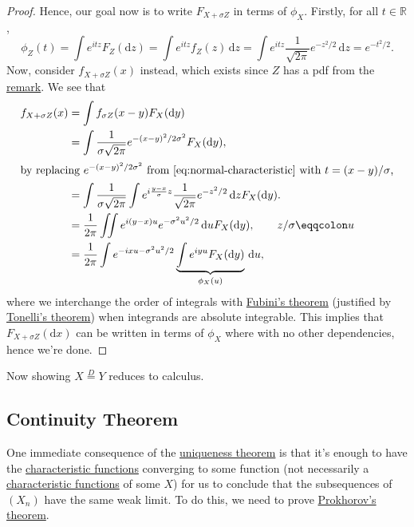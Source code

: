 \begin{proof}
	Hence, our goal now is to write \(F_{X + \sigma Z}\) in terms of \(\phi _X\). Firstly, for all \(t\in \mathbb{R} \),
	\begin{equation}\label{eq:normal-characteristic}
		\phi _Z(t)
		= \int e^{i t z} F_Z(\mathrm{d} z)
		= \int e^{i t z} f_Z(z) \,\mathrm{d} z
		= \int e^{i t z} \frac{1}{\sqrt{2\pi } } e^{-z^2 / 2} \,\mathrm{d} z
		= e^{-t^2 / 2}.
	\end{equation}
	Now, consider \(f_{X + \sigma Z}(x)\) instead, which exists since \(Z\) has a pdf from the \hyperref[rmk:pdf-of-X+Y]{remark}. We see that
	\begin{align*}
		f_{X + \sigma Z}(x)
		 & = \int f_{\sigma Z}(x-y) F_{X}(\mathrm{d} y)                                                                                                       \\
		 & = \int \frac{1}{\sigma \sqrt{2 \pi } } e^{- (x-y)^2 / 2\sigma ^2} F_X(\mathrm{d} y) ,                                                              \\
		\shortintertext{by replacing \(e^{-(x-y)^2 / 2\sigma ^2}\) from \autoref{eq:normal-characteristic} with \(t = (x - y) / \sigma \),}
		 & = \int \frac{1}{\sigma \sqrt{2\pi } } \int e^{i \frac{y - x}{\sigma } z} \frac{1}{\sqrt{2\pi } }  e^{- z^2 / 2} \,\mathrm{d} z F_X(\mathrm{d} y) . \\
		 & = \frac{1}{2\pi } \iint e^{i (y - x) u} e^{- \sigma ^2 u^2 / 2} \,\mathrm{d} u F_X(\mathrm{d} y) , \tag*{\(z / \sigma \eqqcolon u\)}               \\
		 & = \frac{1}{2\pi } \int e^{-i x u - \sigma ^2 u^2 / 2} \underbrace{\int e^{i y u} F_X(\mathrm{d} y)}_{\phi _X(u)} \,\mathrm{d} u ,
	\end{align*}
	where we interchange the order of integrals with \href{https://en.wikipedia.org/wiki/Fubini's_theorem}{Fubini's theorem} (justified by \href{https://en.wikipedia.org/wiki/Fubini%27s_theorem#Fubini%E2%80%93Tonelli_theorem}{Tonelli's theorem}) when integrands are absolute integrable. This implies that \(F_{X + \sigma Z} (\mathrm{d} x)\) can be written in terms of \(\phi _X\) where with no other dependencies, hence we're done.
\end{proof}

\begin{note}
	Now showing \(X \overset{D}{=} Y\) reduces to calculus.
\end{note}

\subsection{Continuity Theorem}
One immediate consequence of the \hyperref[thm:characteristic-function-uniqueness]{uniqueness theorem} is that it's enough to have the \hyperref[def:characteristic-function]{characteristic functions} converging to some function (not necessarily a \hyperref[def:characteristic-function]{characteristic functions} of some \(X\)) for us to conclude that the subsequences of \((X_n)\) have the same weak limit. To do this, we need to prove \hyperref[thm:Prokhorov]{Prokhorov's theorem}.

